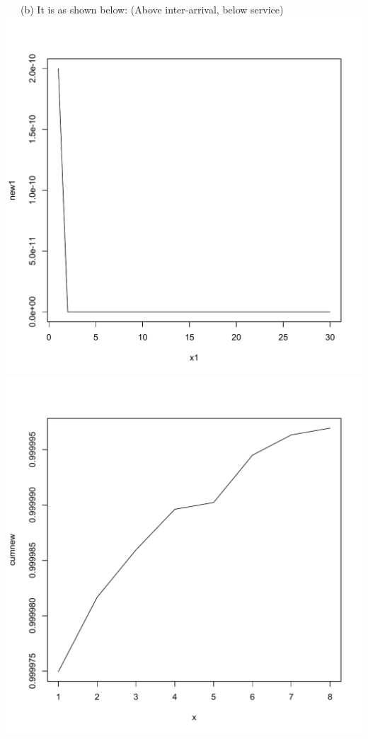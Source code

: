 \documentclass[11pt]{article}
\begin{document}
~~~(b) It is as shown below: (Above inter-arrival, below service)\\
\includegraphics[scale=0.5]{pdfservice2.pdf}
\includegraphics[scale=0.5]{cdfservice2.pdf}
\end{document}
